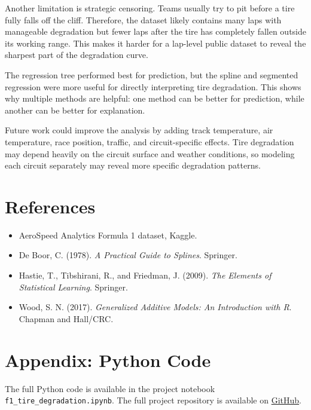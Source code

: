 \documentclass[11pt]{article}
\begin{document}
Another limitation is strategic censoring. Teams usually try to pit before a tire fully falls off the cliff. Therefore, the dataset likely contains many laps with manageable degradation but fewer laps after the tire has completely fallen outside its working range. This makes it harder for a lap-level public dataset to reveal the sharpest part of the degradation curve.

The regression tree performed best for prediction, but the spline and segmented regression were more useful for directly interpreting tire degradation. This shows why multiple methods are helpful: one method can be better for prediction, while another can be better for explanation.

Future work could improve the analysis by adding track temperature, air temperature, race position, traffic, and circuit-specific effects. Tire degradation may depend heavily on the circuit surface and weather conditions, so modeling each circuit separately may reveal more specific degradation patterns.

\section{References}

\begin{itemize}
\item AeroSpeed Analytics Formula 1 dataset, Kaggle.
\item De Boor, C. (1978). \textit{A Practical Guide to Splines}. Springer.
\item Hastie, T., Tibshirani, R., and Friedman, J. (2009). \textit{The Elements of Statistical Learning}. Springer.
\item Wood, S. N. (2017). \textit{Generalized Additive Models: An Introduction with R}. Chapman and Hall/CRC.
\end{itemize}

\section{Appendix: Python Code}


The full Python code is available in the project notebook \texttt{f1\_tire\_degradation.ipynb}. 
The full project repository is available on \href{https://github.com/Sami-Krothapalli/F1-Tire-Degradation-Analysis}{GitHub}.
\end{document}
